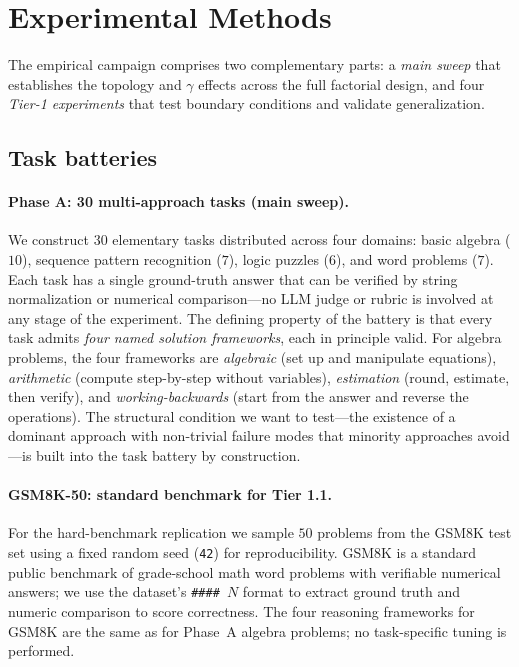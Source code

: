 \documentclass[11pt]{amsart}
\newcommand{\g}{\gamma}
\newcommand\1{{\mathds{1}}}
\theoremstyle{definition}
\theoremstyle{remark}
\numberwithin{equation}{section}
\begin{document}
\section{Experimental Methods}\label{sec:methods}

The empirical campaign comprises two complementary parts: a \emph{main sweep} that establishes the topology and $\g$ effects across the full factorial design, and four \emph{Tier-1 experiments} that test boundary conditions and validate generalization.

\subsection{Task batteries}\label{sec:tasks}

\paragraph{Phase A: 30 multi-approach tasks (main sweep).}
We construct $30$ elementary tasks distributed across four domains: basic algebra ($10$), sequence pattern recognition ($7$), logic puzzles ($6$), and word problems ($7$).
Each task has a single ground-truth answer that can be verified by string normalization or numerical comparison---no LLM judge or rubric is involved at any stage of the experiment.
The defining property of the battery is that every task admits \emph{four named solution frameworks}, each in principle valid.
For algebra problems, the four frameworks are \textit{algebraic} (set up and manipulate equations), \textit{arithmetic} (compute step-by-step without variables), \textit{estimation} (round, estimate, then verify), and \textit{working-backwards} (start from the answer and reverse the operations).
The structural condition we want to test---the existence of a dominant approach with non-trivial failure modes that minority approaches avoid---is built into the task battery by construction.

\paragraph{GSM8K-50: standard benchmark for Tier 1.1.}
For the hard-benchmark replication we sample $50$ problems from the GSM8K test set \cite{Cobbe2021GSM8K} using a fixed random seed (\texttt{42}) for reproducibility.
GSM8K is a standard public benchmark of grade-school math word problems with verifiable numerical answers; we use the dataset's \texttt{\#\#\#\#~$N$} format to extract ground truth and numeric comparison to score correctness.
The four reasoning frameworks for GSM8K are the same as for Phase~A algebra problems; no task-specific tuning is performed.
\end{document}
